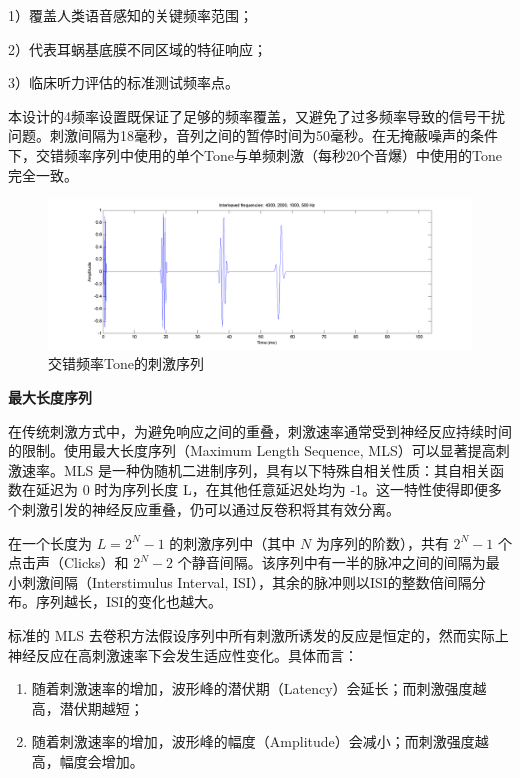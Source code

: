 1）覆盖人类语音感知的关键频率范围；

2）代表耳蜗基底膜不同区域的特征响应； 

3）临床听力评估的标准测试频率点。

本设计的4频率设置既保证了足够的频率覆盖，又避免了过多频率导致的信号干扰问题。刺激间隔为18毫秒，音列之间的暂停时间为50毫秒。在无掩蔽噪声的条件下，交错频率序列中使用的单个Tone与单频刺激（每秒20个音爆）中使用的Tone完全一致。

\begin{figure}[H]
  \centering
  \includegraphics[width=1\textwidth]{images/InterleavedFrequencies.png}
  \caption{交错频率Tone的刺激序列}
  \label{fig:InterleavedFrequencies}
\end{figure}

\textbf{最大长度序列}

在传统刺激方式中，为避免响应之间的重叠，刺激速率通常受到神经反应持续时间的限制。使用最大长度序列（Maximum Length Sequence, MLS）可以显著提高刺激速率。MLS 是一种伪随机二进制序列，具有以下特殊自相关性质：其自相关函数在延迟为 0 时为序列长度 L，在其他任意延迟处均为 -1。这一特性使得即便多个刺激引发的神经反应重叠，仍可以通过反卷积将其有效分离。

在一个长度为 $L = 2^N - 1$ 的刺激序列中（其中 $N$ 为序列的阶数），共有 $2^N - 1$ 个点击声（Clicks）和 $2^N - 2$ 个静音间隔。该序列中有一半的脉冲之间的间隔为最小刺激间隔（Interstimulus Interval, ISI），其余的脉冲则以ISI的整数倍间隔分布。序列越长，ISI的变化也越大。

标准的 MLS 去卷积方法假设序列中所有刺激所诱发的反应是恒定的，然而实际上神经反应在高刺激速率下会发生适应性变化。具体而言：

\begin{enumerate}
    \item 随着刺激速率的增加，波形峰的潜伏期（Latency）会延长；而刺激强度越高，潜伏期越短；
    \item 随着刺激速率的增加，波形峰的幅度（Amplitude）会减小；而刺激强度越高，幅度会增加。
\end{enumerate}

